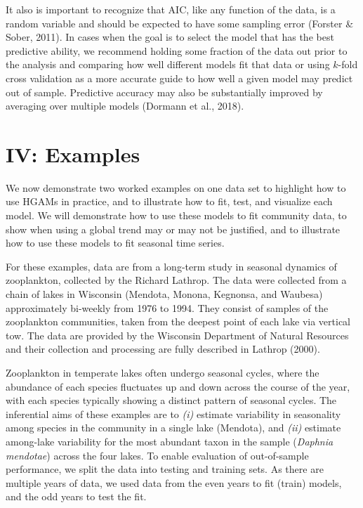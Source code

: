 \documentclass[12pt]{article}
\begin{document}
It also is important to recognize that AIC, like any function of the
data, is a random variable and should be expected to have some sampling
error (Forster \& Sober, 2011). In cases when the goal is to select the
model that has the best predictive ability, we recommend holding some
fraction of the data out prior to the analysis and comparing how well
different models fit that data or using \(k\)-fold cross validation as a
more accurate guide to how well a given model may predict out of sample.
Predictive accuracy may also be substantially improved by averaging over
multiple models (Dormann et al., 2018).

\FloatBarrier

\section{IV: Examples}\label{iv-examples}

We now demonstrate two worked examples on one data set to highlight how
to use HGAMs in practice, and to illustrate how to fit, test, and
visualize each model. We will demonstrate how to use these models to fit
community data, to show when using a global trend may or may not be
justified, and to illustrate how to use these models to fit seasonal
time series.

For these examples, data are from a long-term study in seasonal dynamics
of zooplankton, collected by the Richard Lathrop. The data were
collected from a chain of lakes in Wisconsin (Mendota, Monona, Kegnonsa,
and Waubesa) approximately bi-weekly from 1976 to 1994. They consist of
samples of the zooplankton communities, taken from the deepest point of
each lake via vertical tow. The data are provided by the Wisconsin
Department of Natural Resources and their collection and processing are
fully described in Lathrop (2000).

Zooplankton in temperate lakes often undergo seasonal cycles, where the
abundance of each species fluctuates up and down across the course of
the year, with each species typically showing a distinct pattern of
seasonal cycles. The inferential aims of these examples are to
\emph{(i)} estimate variability in seasonality among species in the
community in a single lake (Mendota), and \emph{(ii)} estimate
among-lake variability for the most abundant taxon in the sample
(\emph{Daphnia mendotae}) across the four lakes. To enable evaluation of
out-of-sample performance, we split the data into testing and training
sets. As there are multiple years of data, we used data from the even
years to fit (train) models, and the odd years to test the fit.
\end{document}
